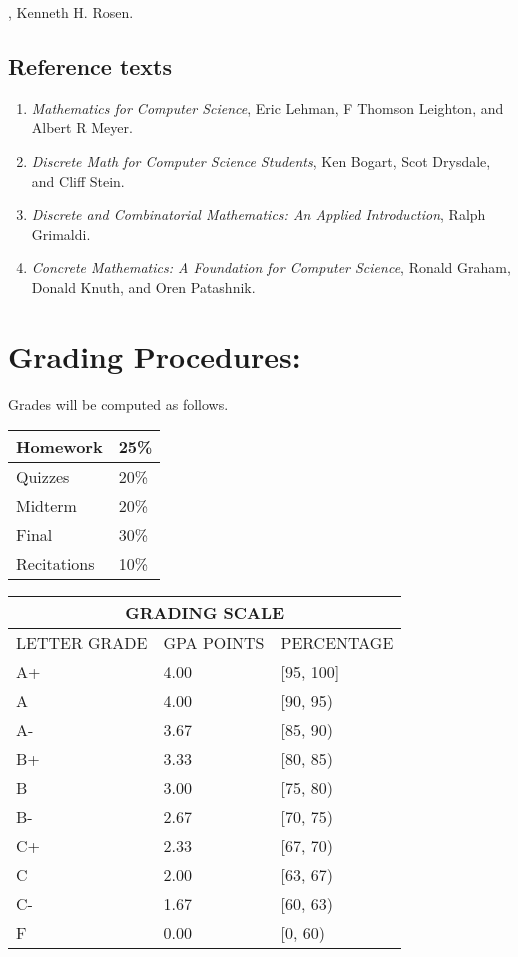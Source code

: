 \documentclass[a4paper]{article}
\begin{document}
, Kenneth H. Rosen.

\subsection*{Reference texts}
  
\begin{enumerate}
\item {\it Mathematics for Computer Science}, Eric Lehman, F Thomson Leighton, and Albert R Meyer.
\item {\it Discrete Math for Computer Science Students}, Ken Bogart, Scot Drysdale, and Cliff Stein.
\item {\it Discrete and Combinatorial Mathematics: An Applied Introduction}, Ralph Grimaldi.
\item {\it Concrete Mathematics: A Foundation for Computer Science}, Ronald Graham, Donald Knuth, and Oren Patashnik.
\end{enumerate}

\section{Grading Procedures:}
\label{sec:grade}

Grades will be computed as follows.\\
\begin{tabular}{|l|l|}
\hline
Homework &	25\%\\\hline
Quizzes &	20\%\\\hline
Midterm & 	20\%\\\hline
Final & 	30\%\\\hline
Recitations & 	10\%\\\hline
\end{tabular}
\begin{tabular}{|l|l|l|}
  \hline
  \multicolumn{3}{|c|}{\bf GRADING SCALE}\\\hline
  LETTER GRADE & GPA POINTS & PERCENTAGE\\\hline
  A+ & 4.00 & [95, 100] \\\hline
  A & 4.00 & [90, 95) \\\hline
  A- & 3.67 & [85, 90) \\\hline
  B+ & 3.33 & [80, 85) \\\hline
  B & 3.00 & [75, 80) \\\hline
  B- & 2.67 & [70, 75) \\\hline
  C+ & 2.33 & [67, 70) \\\hline
  C & 2.00 & [63, 67) \\\hline
  C- & 1.67 & [60, 63) \\\hline
  F & 0.00 & [0, 60)\\\hline
\end{tabular}
\end{document}
